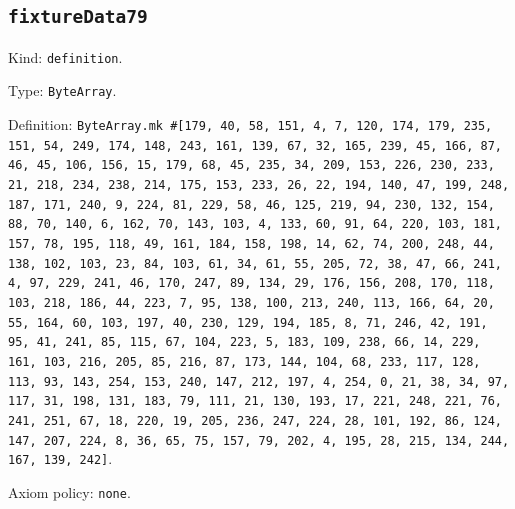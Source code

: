 \documentclass[11pt]{article}
\begin{document}
\subsection*{\texttt{fixtureData79}}
\noindent Kind: \texttt{definition}.\par
\noindent Type: \texttt{ByteArray}.\par
\noindent Definition: \texttt{ByteArray.mk \#[179, 40, 58, 151, 4, 7, 120, 174, 179, 235, 151, 54, 249, 174, 148, 243, 161, 139, 67, 32, 165, 239, 45, 166, 87, 46, 45, 106, 156, 15, 179, 68, 45, 235, 34, 209, 153, 226, 230, 233, 21, 218, 234, 238, 214, 175, 153, 233, 26, 22, 194, 140, 47, 199, 248, 187, 171, 240, 9, 224, 81, 229, 58, 46, 125, 219, 94, 230, 132, 154, 88, 70, 140, 6, 162, 70, 143, 103, 4, 133, 60, 91, 64, 220, 103, 181, 157, 78, 195, 118, 49, 161, 184, 158, 198, 14, 62, 74, 200, 248, 44, 138, 102, 103, 23, 84, 103, 61, 34, 61, 55, 205, 72, 38, 47, 66, 241, 4, 97, 229, 241, 46, 170, 247, 89, 134, 29, 176, 156, 208, 170, 118, 103, 218, 186, 44, 223, 7, 95, 138, 100, 213, 240, 113, 166, 64, 20, 55, 164, 60, 103, 197, 40, 230, 129, 194, 185, 8, 71, 246, 42, 191, 95, 41, 241, 85, 115, 67, 104, 223, 5, 183, 109, 238, 66, 14, 229, 161, 103, 216, 205, 85, 216, 87, 173, 144, 104, 68, 233, 117, 128, 113, 93, 143, 254, 153, 240, 147, 212, 197, 4, 254, 0, 21, 38, 34, 97, 117, 31, 198, 131, 183, 79, 111, 21, 130, 193, 17, 221, 248, 221, 76, 241, 251, 67, 18, 220, 19, 205, 236, 247, 224, 28, 101, 192, 86, 124, 147, 207, 224, 8, 36, 65, 75, 157, 79, 202, 4, 195, 28, 215, 134, 244, 167, 139, 242]}.\par
\noindent Axiom policy: \texttt{none}.\par
\end{document}
